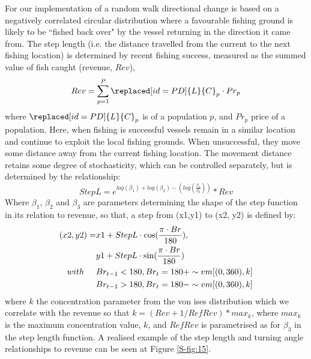 \documentclass[review]{elsarticle}
\begin{document}
For our implementation of a random walk directional change is based on a
negatively correlated circular distribution where a favourable fishing ground
is likely to be ``fished back over" by the vessel returning in the direction it
came from.  The step length (i.e. the distance travelled from the current to
the next fishing location) is determined by  recent
fishing success, measured as the summed value of fish caught (revenue, $Rev$),
\begin{equation}
Rev = \sum_{p=1}^{P} \replaced[id=PD]{L}{C}_{p} \cdot Pr_{p} 
\end{equation}
where $\replaced[id=PD]{L}{C}_{p}$ is  of a
population $p$, and $Pr_{p}$ price of a population. Here, when fishing is
successful vessels remain in a similar location and continue to exploit the
local fishing grounds. When unsuccessful, they move some distance away from
the current fishing location.  The movement distance retains some degree of
stochasticity, which can be controlled separately, but is determined by the
relationship: 
\begin{equation*}
	StepL = e^{log(\beta_{1}) + log(\beta_{2}) -
		(log(\frac{\beta_{1}}{\beta_{3}}))} * Rev
\end{equation*}
Where $\beta_{1}$, $\beta_{2}$ and $\beta_{3}$ are parameters determining the
shape of the step function in its relation to revenue, so that, a step from
(x1,y1) to (x2, y2) is defined by:
\begin{equation*}
	\begin{split}
 (x2, y2) =  & x1 + StepL \cdot \cos (\frac{\pi \cdot Br}{180}), \\
             & y1 + StepL \cdot \sin (\frac{\pi \cdot Br}{180}) \\	
 with  \hspace{0.5cm}     & Br_{t-1} < 180, Br_{t} = 180 + \sim vm[(0,360), k] \\
 			  & Br_{t-1} > 180, Br_{t} = 180 - \sim vm[(0,360), k] \\
	\end{split}
\end{equation*}
where $k$ the concentration parameter from the von ises
distribution which we correlate with the revenue so that $k = (Rev + 1 /
RefRev) * max_{k}$, where $max_{k}$ is the maximum concentration value, $k$,
and $RefRev$ is parametrised as for $\beta_{3}$ in the step length function. A
realised example of the step length and turning angle relationships to revenue
can be seen at Figure \ref{S-fig:15}.
\end{document}
